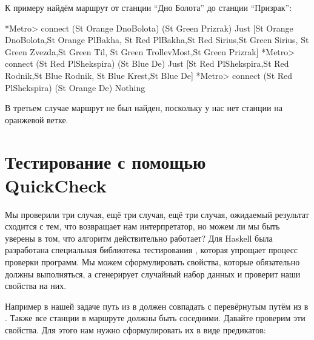 К примеру найдём маршрут от станции ``Дно Болота'' до станции
``Призрак'':


\begin{code}
*Metro> connect (St Orange DnoBolota) (St Green Prizrak)
Just [St Orange DnoBolota,St Orange PlBakha,
    St Red PlBakha,St Red Sirius,St Green Sirius,
    St Green Zvezda,St Green Til,
    St Green TrollevMost,St Green Prizrak]
*Metro> connect (St Red PlShekspira) (St Blue De)
Just [St Red PlShekspira,St Red Rodnik,St Blue Rodnik,
    St Blue Krest,St Blue De]
*Metro> connect (St Red PlShekspira) (St Orange De)
Nothing
\end{code}

В третьем случае маршрут не был найден, поскольку у нас нет станции
 на оранжевой ветке.

\section{Тестирование с помощью QuickCheck}

Мы проверили три случая, ещё три случая, ещё три случая, ожидаемый
результат сходится с тем, что возвращает нам интерпретатор, но можем ли
мы быть уверены в том, что алгоритм действительно работает? Для Haskell
была разработана специальная библиотека тестирования ,
которая упрощает процесс проверки программ. Мы можем сформулировать
свойства, которые обязательно должны выполняться, а 
сгенерирует случайный набор данных и проверит наши свойства на них.

Например в нашей задаче путь из  в  должен совпадать с
перевёрнутым путём из  в . Также все станции в маршруте
должны быть соседними. Давайте проверим эти свойства. Для этого нам
нужно сформулировать их в виде предикатов:




